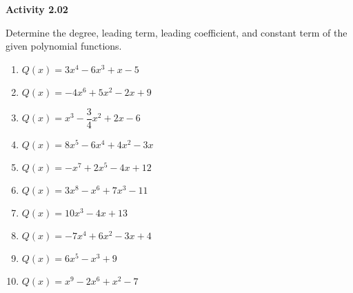 \vspace{0.3ex}
\noindent\textbf{Activity 2.02}

\vspace{0.2ex}

Determine the degree, leading term, leading coefficient, and constant term of the given polynomial functions.
\begin{multicols}{2}
\begin{enumerate}
    \item \( Q(x) = 3x^4 - 6x^3 + x - 5 \)
    \item \( Q(x) = -4x^6 + 5x^2 - 2x + 9 \)
    \item \( Q(x) = x^3 - \dfrac{3}{4}x^2 + 2x - 6 \)
    \item \( Q(x) = 8x^5 - 6x^4 + 4x^2 - 3x \)
    \item \( Q(x) = -x^7 + 2x^5 - 4x + 12 \)
    \item \( Q(x) = 3x^8 - x^6 + 7x^3 - 11 \)
    \item \( Q(x) = 10x^3 - 4x + 13 \)
    \item \( Q(x) = -7x^4 + 6x^2 - 3x + 4 \)
    \item \( Q(x) = 6x^5 - x^3 + 9 \)
    \item \( Q(x) = x^9 - 2x^6 + x^2 - 7 \)
\end{enumerate}
\end{multicols}
